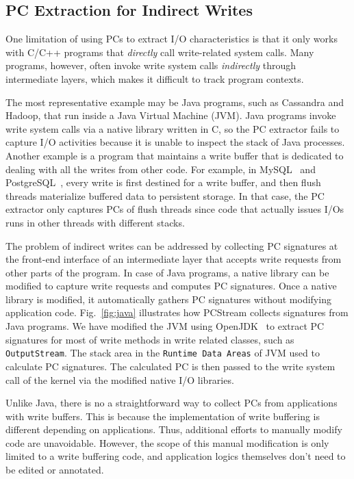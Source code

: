 \subsection{PC Extraction for Indirect Writes}
One limitation of using PCs to extract I/O characteristics is that it only
works with C/C++ programs that \textit{directly} call write-related system
calls.  Many programs, however, often invoke write system calls
\textit{indirectly} through intermediate layers, which makes it difficult to
track program contexts.

The most representative example may be Java programs, such as Cassandra and
Hadoop, that run inside a Java Virtual Machine (JVM). Java programs invoke
write system calls via a native library written in C, so the PC extractor fails
to capture I/O activities because it is unable to inspect the stack of Java
processes.  Another example is a program that maintains a write buffer that is
dedicated to dealing with all the writes from other code. For example, in
MySQL~\cite{MySQL} and PostgreSQL~\cite{PostgreSQL}, every write is first
destined for a write buffer, and then flush threads materialize buffered data
to persistent storage.  In that case, the PC extractor only captures PCs of
flush threads since code that actually issues I/Os runs in other threads with
different stacks.

The problem of indirect writes can be addressed by collecting PC signatures at
the front-end interface of an intermediate layer that accepts write requests
from other parts of the program. In case of Java programs, a native library can
be modified to capture write requests and computes PC signatures. Once a native
library is modified, it automatically gathers PC signatures without modifying
application code. Fig.~\ref{fig:java} illustrates how \textsf{PCStream}
collects signatures from Java programs.  We have modified the JVM using
OpenJDK~\cite{OpenJDK} to extract PC signatures for most of write methods in
write related classes, such as \texttt{OutputStream}.  The stack area in the
\texttt{Runtime Data Areas} of JVM used to calculate PC signatures.  The
calculated PC is then passed to the write system call of the kernel via the
modified native I/O libraries.

Unlike Java, there is no a straightforward way to collect PCs from applications
with write buffers. This is because the implementation of write buffering is
different depending on applications. Thus, additional efforts to manually
modify code are unavoidable. However, the scope of this manual modification is
only limited to a write buffering code, and application logics themselves don't
need to be edited or annotated.


